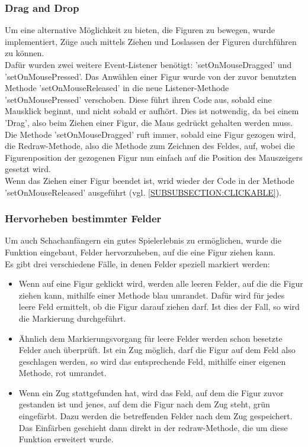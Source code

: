 \documentclass[12pt,a4paper]{article}
\begin{document}
\subsubsection{Drag and Drop}
\label{SUBSUBSECTION:DRAGANDDROP}
Um eine alternative Möglichkeit zu bieten, die Figuren zu bewegen, wurde implementiert, Züge auch mittels Ziehen und Loslassen der Figuren durchführen zu können.\\
Dafür wurden zwei weitere Event-Listener benötigt: 'setOnMouseDragged' und 'setOnMousePressed'. Das Anwählen einer Figur wurde von der zuvor benutzten Methode 'setOnMouseReleased' in die neue Listener-Methode 'setOnMousePressed' verschoben. Diese führt ihren Code aus, sobald eine Mausklick beginnt, und nicht sobald er aufhört. Dies ist notwendig, da bei einem 'Drag', also beim Ziehen einer Figur, die Maus gedrückt gehalten werden muss.\\
Die Methode 'setOnMouseDragged' ruft immer, sobald eine Figur gezogen wird, die Redraw-Methode, also die Methode zum Zeichnen des Feldes, auf, wobei die Figurenposition der gezogenen Figur nun einfach auf die Position des Mauszeigers gesetzt wird.\\
Wenn das Ziehen einer Figur beendet ist, wrid wieder der Code in der Methode 'setOnMouseReleased' ausgeführt (vgl. \ref{SUBSUBSECTION:CLICKABLE}).


\subsubsection{Hervorheben bestimmter Felder}
\label{SUBSUBSECTION:TILEHIGHLIGHT}
Um auch Schachanfängern ein gutes Spielerlebnis zu ermöglichen, wurde die Funktion eingebaut, Felder hervorzuheben, auf die eine Figur ziehen kann.\\
Es gibt drei verschiedene Fälle, in denen Felder speziell markiert werden: 
\begin{itemize}

\item{Wenn auf eine Figur geklickt wird, werden alle leeren Felder, auf die die Figur ziehen kann, mithilfe einer Methode blau umrandet. Dafür wird für jedes leere Feld ermittelt, ob die Figur darauf ziehen darf. Ist dies der Fall, so wird die Markierung durchgeführt. }

\item{Ähnlich dem Markierungsvorgang für leere Felder werden schon besetzte Felder auch überprüft. Ist ein Zug möglich, darf die Figur auf dem Feld also geschlagen werden, so wird das entsprechende Feld, mithilfe einer eigenen Methode, rot umrandet.}

\item{Wenn ein Zug stattgefunden hat, wird das Feld, auf dem die Figur zuvor gestanden ist und jenes, auf dem die Figur nach dem Zug steht, grün eingefärbt. Dazu werden die betreffenden Felder nach dem Zug gespeichert. Das Einfärben geschieht dann direkt in der redraw-Methode, die um diese Funktion erweitert wurde. }


\end{itemize}
\end{document}
